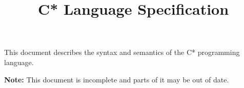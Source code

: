 \documentclass[oneside]{memoir}
\begin{document}
\title{C* Language Specification}
\maketitle

This document describes the syntax and semantics of the C* programming language.

\textbf{Note:} This document is incomplete and parts of it may be out of date.

\tableofcontents







\end{document}
